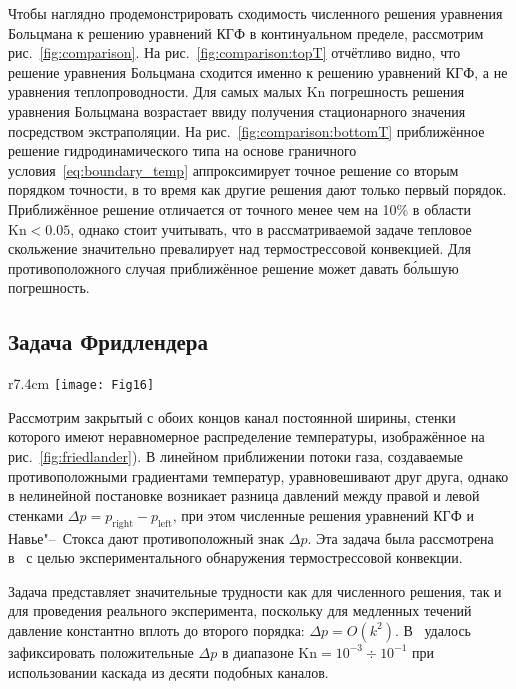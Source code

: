 \documentclass[
aps,%
12pt,%
final,%
notitlepage,%
oneside,%
onecolumn,%
nobibnotes,%
nofootinbib,%
superscriptaddress,%
noshowpacs,%
centertags]%
{revtex4}
\newcommand{\Kn}{\mathrm{Kn}}
\newcommand{\OO}[1]{O\left(#1\right)}
\begin{document}
Чтобы наглядно продемонстрировать сходимость численного решения уравнения Больцмана к
решению уравнений КГФ в континуальном пределе, рассмотрим рис.~\ref{fig:comparison}.
На рис.~\ref{fig:comparison:topT} отчётливо видно, что решение уравнения Больцмана сходится
именно к решению уравнений КГФ, а не уравнения теплопроводности.
Для самых малых \(\Kn\) погрешность решения уравнения Больцмана возрастает
ввиду получения стационарного значения посредством экстраполяции.
На рис.~\ref{fig:comparison:bottomT} приближённое решение гидродинамического типа
на основе граничного условия~\eqref{eq:boundary_temp} аппроксимирует
точное решение со вторым порядком точности,
в то время как другие решения дают только первый порядок.
Приближённое решение отличается от точного менее чем на 10\% в области \(\Kn<0.05\),
однако стоит учитывать, что в рассматриваемой задаче тепловое скольжение значительно превалирует
над термострессовой конвекцией. Для противоположного случая приближённое решение может давать
б\'{о}льшую погрешность.

\subsection{Задача Фридлендера}

\begin{wrapfigure}{r}{7.4cm}
    \vspace{-10pt}
    \centering
    \texttt{[image: Fig16]}
    \vspace{-20pt}
    \caption{Геометрия задачи}\label{fig:friedlander}
    \vspace{20pt}
\end{wrapfigure}

Рассмотрим закрытый с обоих концов канал постоянной ширины,
стенки которого имеют неравномерное распределение температуры,
изображённое на рис.~\ref{fig:friedlander}).
В линейном приближении потоки газа, создаваемые противоположными градиентами температур,
уравновешивают друг друга, однако в нелинейной постановке возникает разница давлений
между правой и левой стенками \(\Delta{p}=p_\mathrm{right} - p_\mathrm{left}\),
при этом численные решения уравнений КГФ и Навье"--~Стокса дают противоположный знак \(\Delta{p}\).
Эта задача была рассмотрена в~\cite{Friedlander1997, Friedlander2003} с целью экспериментального
обнаружения термострессовой конвекции.

Задача представляет значительные трудности как для численного решения,
так и для проведения реального эксперимента, поскольку для медленных течений
давление константно вплоть до второго порядка: \(\Delta{p} = \OO{k^2}\).
В~\cite{Friedlander2003} удалось зафиксировать
положительные \(\Delta{p}\) в диапазоне \(\Kn = 10^{-3} \div 10^{-1}\)
при использовании каскада из десяти подобных каналов.
\end{document}

